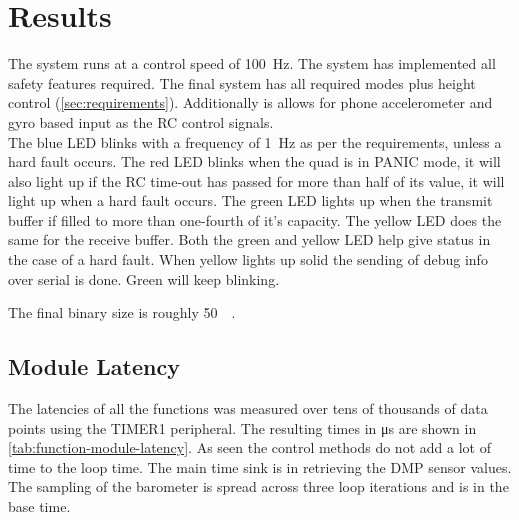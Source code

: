 \documentclass[final]{article}
\begin{document}
\section{Results}



The system runs at a control speed of \SI{100}{\hertz}.
The system has implemented all safety features required.
The final system has all required modes plus height control (\cref{sec:requirements}).
Additionally is allows for phone accelerometer and gyro based input as the RC control signals.\\
The blue LED blinks with a frequency of \SI{1}{\hertz} as per the requirements, unless a hard fault occurs.
The red LED blinks when the quad is in PANIC mode, it will also light up if the RC time-out has passed for more than half of its value, it will light up when a hard fault occurs.
The green LED lights up when the transmit buffer if filled to more than one-fourth of it's capacity.
The yellow LED does the same for the receive buffer.
Both the green and yellow LED help give status in the case of a hard fault.
When yellow lights up solid the sending of debug info over serial is done.
Green will keep blinking.

The final binary size is roughly \SI{50}{\kilo\byte}.


\subsection{Module Latency}
\label{ssec:module-latency}
The latencies of all the functions was measured over tens of thousands of data points using the TIMER1 peripheral.
The resulting times in \si{\micro\second} are shown in \cref{tab:function-module-latency}.
As seen the control methods do not add a lot of time to the loop time.
The main time sink is in retrieving the DMP sensor values.
The sampling of the barometer is spread across three loop iterations and is in the base time.
\end{document}
